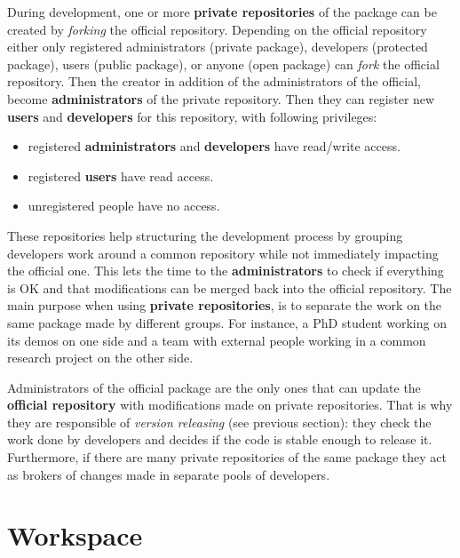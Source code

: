 \documentclass[12pt,a4paper]{article}
\begin{document}
During development, one or more \textbf{private repositories} of the package can be created by \textit{forking} the official repository. Depending on the official repository either only registered administrators (private package), developers (protected package), users (public package), or anyone (open package) can \textit{fork} the official repository. Then the creator in addition of the administrators of the official, become \textbf{administrators} of the private repository. Then they can register new \textbf{users} and \textbf{developers} for this repository, with following privileges:
\begin{itemize}
\item registered \textbf{administrators} and \textbf{developers} have read/write access.
\item registered \textbf{users} have read access.
\item unregistered people have no access.
\end{itemize}

These repositories help structuring the development process by grouping developers work around a common repository while not immediately impacting the official one. This lets the time to the \textbf{administrators} to check if everything is OK and that modifications can be merged back into the official repository. The main purpose when using \textbf{private repositories}, is to separate the work on the same package made by different groups. For instance, a PhD student working on its demos on one side and a team with external people working in a common research project on the other side.

Administrators of the official package are the only ones that can update the \textbf{official repository} with modifications made on private repositories. That is why they are responsible of \textit{version releasing} (see previous section): they check the work done by developers and decides if the code is stable enough to release it. Furthermore, if there are many private repositories of the same package they act as brokers of changes made in separate pools of developers.

\pagebreak

\section{Workspace}
\end{document}
